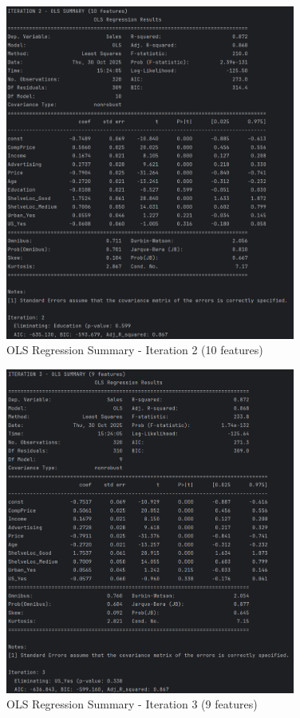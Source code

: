 \documentclass[12pt]{article}
\begin{document}
\begin{figure}[H]
    \centering
    \includegraphics[width=0.85\textwidth]{images/ols_summary_iter2.png}
    \caption{OLS Regression Summary - Iteration 2 (10 features)}
    \label{fig:ols_iter2}
\end{figure}

\begin{figure}[H]
    \centering
    \includegraphics[width=0.85\textwidth]{images/ols_summary_iter3.png}
    \caption{OLS Regression Summary - Iteration 3 (9 features)}
    \label{fig:ols_iter3}
\end{figure}
\end{document}
